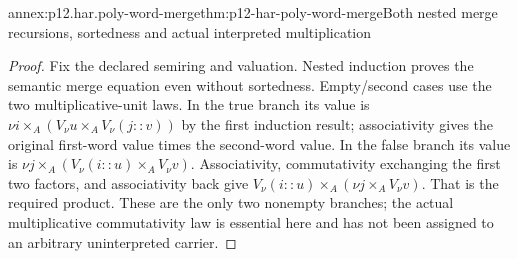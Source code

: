 \begin{annexitem}{annex:p12.har.poly-word-merge}{thm:p12-har-poly-word-merge}{Both nested merge recursions, sortedness and actual interpreted multiplication}
\begin{proof}
Fix the declared semiring and valuation. Nested induction proves the
semantic merge equation even without sortedness. Empty/second cases
use the two multiplicative-unit laws. In the true branch its value is
\(\nu i\times_A(V_\nu u\times_A V_\nu(j::v))\) by the first
induction result; associativity gives the original first-word value
times the second-word value. In the false branch its value is
\(\nu j\times_A(V_\nu(i::u)\times_A V_\nu v)\).
Associativity, commutativity exchanging the first two factors, and
associativity back give
\(V_\nu(i::u)\times_A(\nu j\times_A V_\nu v)\).
That is the required product. These are the only two nonempty branches;
the actual multiplicative commutativity law is essential here and has
not been assigned to an arbitrary uninterpreted carrier.
\end{proof}
\end{annexitem}

